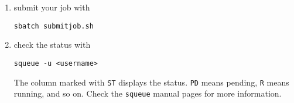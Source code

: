 \documentclass{nada-ten}
\begin{document}
\begin{enumerate}
\item submit your job with
\begin{verbatim}
sbatch submitjob.sh
\end{verbatim}
\item check the status with
\begin{verbatim}
squeue -u <username>
\end{verbatim}
The column marked with \texttt{ST} displays the status. \texttt{PD} means pending, \texttt{R} means running, and so on. Check the \texttt{squeue} manual pages for more information.
\end{enumerate}
\end{document}
